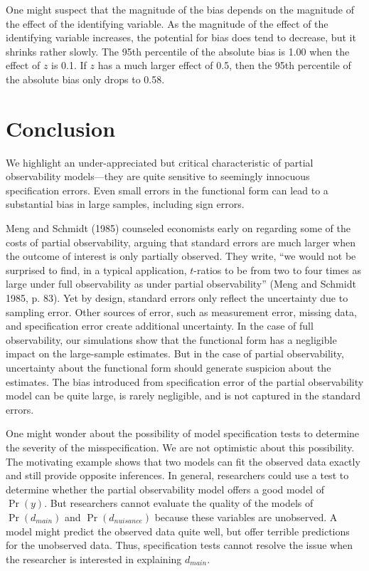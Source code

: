 \documentclass[10pt]{article}
\begin{document}
One might suspect that the magnitude of the bias depends on the magnitude of the effect of the identifying variable. As the magnitude of the effect of the identifying variable increases, the potential for bias does tend to decrease, but it shrinks rather slowly. The 95th percentile of the absolute bias is 1.00 when the effect of $z$ is 0.1. If $z$ has a much larger effect of 0.5, then the 95th percentile of the absolute bias only drops to 0.58.

\section*{Conclusion}

We highlight an under-appreciated but critical characteristic of partial observability models---they are quite sensitive to seemingly innocuous specification errors. 
Even small errors in the functional form can lead to a substantial bias in large samples, including sign errors.

Meng and Schmidt (1985) counseled economists early on regarding some of the costs of partial observability, arguing that standard errors are much larger when the outcome of interest is only partially observed. 
They write, ``we would not be surprised to find, in a typical application, $t$-ratios to be from two to four times as large under full observability as under partial observability'' (Meng and Schmidt 1985, p. 83). 
Yet by design, standard errors only reflect the uncertainty due to sampling error. 
Other sources of error, such as measurement error, missing data, and specification error create additional uncertainty. 
In the case of full observability, our simulations show that the functional form has a negligible impact on the large-sample estimates. 
But in the case of partial observability, uncertainty about the functional form should generate suspicion about the estimates. 
The bias introduced from specification error of the partial observability model can be quite large, is rarely negligible, and is not captured in the standard errors.

One might wonder about the possibility of model specification tests to determine the severity of the misspecification. 
We are not optimistic about this possibility. 
The motivating example shows that two models can fit the observed data exactly and still provide opposite inferences. 
In general, researchers could use a test to determine whether the partial observability model offers a good model of $\Pr(y)$. 
But researchers cannot evaluate the quality of the models of $\Pr(d_{main})$ and $\Pr(d_{nuisance})$ because these variables are unobserved.
A model might predict the observed data quite well, but offer terrible predictions for the unobserved data.
Thus, specification tests cannot resolve the issue when the researcher is interested in explaining $d_{main}$.
\end{document}
